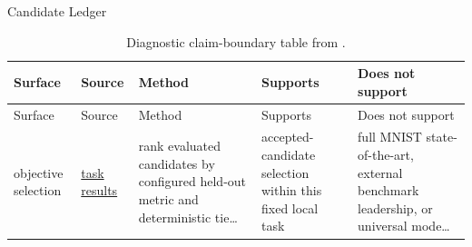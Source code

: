 \documentclass[
  ignorenonframetext,
]{beamer}
\begin{document}
\begin{frame}{Candidate Ledger}
\begin{longtable}[]{@{}
  >{\raggedright\arraybackslash}p{}
  >{\raggedright\arraybackslash}p{}
  >{\raggedright\arraybackslash}p{}
  >{\raggedright\arraybackslash}p{}
  >{\raggedright\arraybackslash}p{}@{}}
\caption{Diagnostic claim-boundary table from
\protect{}.}\label{tbl:diagnostic-boundary}\tabularnewline
\toprule\noalign{}
\begin{minipage}[b]{\linewidth}\raggedright
Surface
\end{minipage} & \begin{minipage}[b]{\linewidth}\raggedright
Source
\end{minipage} & \begin{minipage}[b]{\linewidth}\raggedright
Method
\end{minipage} & \begin{minipage}[b]{\linewidth}\raggedright
Supports
\end{minipage} & \begin{minipage}[b]{\linewidth}\raggedright
Does not support
\end{minipage} \\
\midrule\noalign{}
\endfirsthead
\toprule\noalign{}
\begin{minipage}[b]{\linewidth}\raggedright
Surface
\end{minipage} & \begin{minipage}[b]{\linewidth}\raggedright
Source
\end{minipage} & \begin{minipage}[b]{\linewidth}\raggedright
Method
\end{minipage} & \begin{minipage}[b]{\linewidth}\raggedright
Supports
\end{minipage} & \begin{minipage}[b]{\linewidth}\raggedright
Does not support
\end{minipage} \\
\midrule\noalign{}
\endhead
objective selection & \href{../data/ml_task_results.json}{task results}
& rank evaluated candidates by configured held-out metric and
deterministic tie\ldots{} & accepted-candidate selection within this
fixed local task & full MNIST state-of-the-art, external benchmark
leadership, or universal mode\ldots{} \\

\end{longtable}
\end{frame}
\end{document}
